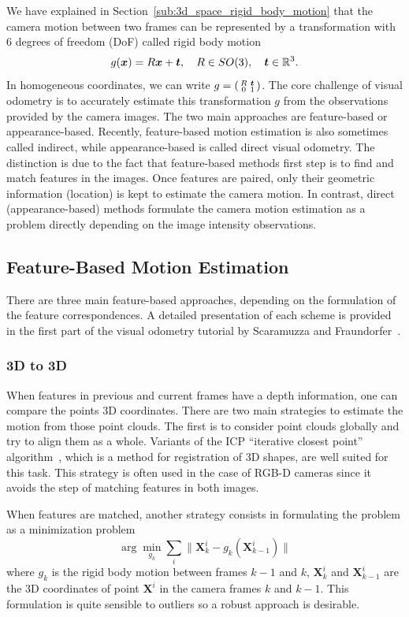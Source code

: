 We have explained in Section~\ref{sub:3d_space_rigid_body_motion}
that the camera motion between two frames can be represented by
a transformation with 6 degrees of freedom (DoF) called rigid body motion
\[
	g(\bm{x}) = R\bm{x} + \bm{t},\quad R \in SO(3),\quad \bm{t} \in \mathbb{R}^3.
\]
In homogeneous coordinates, we can write
$g = \left(\begin{smallmatrix} R & \bm{t}\\ 0 & 1 \end{smallmatrix} \right)$.
The core challenge of visual odometry is to accurately estimate
this transformation $g$ from the observations provided by the camera images.
The two main approaches are feature-based or appearance-based.
Recently, feature-based motion estimation is also sometimes called indirect,
while appearance-based is called direct visual odometry.
The distinction is due to the fact that feature-based methods
first step is to find and match features in the images.
Once features are paired, only their geometric information (location) is kept
to estimate the camera motion.
In contrast, direct (appearance-based) methods formulate the camera motion
estimation as a problem directly depending on the image intensity observations.


\subsection{Feature-Based Motion Estimation}%
\label{sub:feature-based}

There are three main feature-based approaches,
depending on the formulation of the feature correspondences.
A detailed presentation of each scheme is provided in the first part
of the visual odometry tutorial by Scaramuzza and Fraundorfer~\cite{scaramuzza2011visual}.

\subsubsection{3D to 3D}%
\label{ssub:3d_to_3d}
When features in previous and current frames have a depth information,
one can compare the points 3D coordinates.
There are two main strategies to estimate the motion from those point clouds.
The first is to consider point clouds globally and try to align them as a whole.
Variants of the ICP ``iterative closest point'' algorithm~\cite{besl1992method},
which is a method for registration of 3D shapes, are well suited for this task.
This strategy is often used in the case of RGB-D cameras since it avoids
the step of matching features in both images.

When features are matched, another strategy consists in
formulating the problem as a minimization problem
\[
	\arg \min_{g_k} \sum_{i} \| \bm{X}_k^i - g_k(\bm{X}_{k-1}^i) \|
\]
where $g_k$ is the rigid body motion between frames $k-1$ and $k$,
$\bm{X}_k^i$ and $\bm{X}_{k-1}^i$ are the 3D coordinates of point $\bm{X}^i$
in the camera frames $k$ and $k-1$.
This formulation is quite sensible to outliers so a robust approach is desirable.

